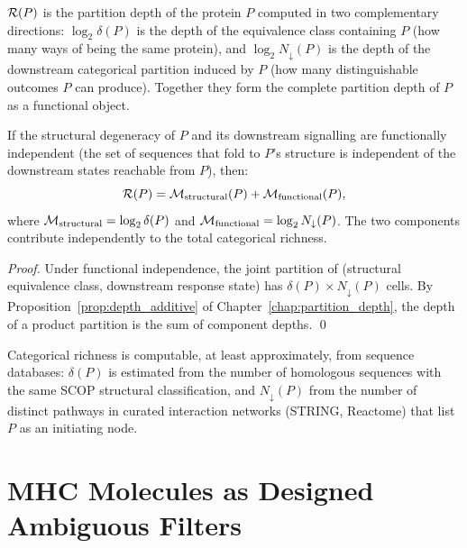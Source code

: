 \begin{remark}
$\mathcal{R}(P)$ is the partition depth of the protein $P$ computed in two
complementary directions: $\log_2 \delta(P)$ is the depth of the equivalence
class containing $P$ (how many ways of being the same protein), and
$\log_2 N_{\downarrow}(P)$ is the depth of the downstream categorical partition
induced by $P$ (how many distinguishable outcomes $P$ can produce). Together
they form the complete partition depth of $P$ as a functional object.
\end{remark}

\begin{proposition}
\label{prop:richness_additive}
If the structural degeneracy of $P$ and its downstream signalling are
functionally independent (the set of sequences that fold to $P$'s structure
is independent of the downstream states reachable from $P$), then:
\begin{equation}
  \mathcal{R}(P) = \mathcal{M}_{\mathrm{structural}}(P) + \mathcal{M}_{\mathrm{functional}}(P),
\end{equation}
where $\mathcal{M}_{\mathrm{structural}} = \log_2 \delta(P)$ and
$\mathcal{M}_{\mathrm{functional}} = \log_2 N_{\downarrow}(P)$. The two components
contribute independently to the total categorical richness.
\end{proposition}

\begin{proof}
Under functional independence, the joint partition of (structural equivalence
class, downstream response state) has $\delta(P) \times N_{\downarrow}(P)$
cells. By Proposition~\ref{prop:depth_additive} of
Chapter~\ref{chap:partition_depth}, the depth of a product partition is the
sum of component depths. \qed
\end{proof}

Categorical richness is computable, at least approximately, from sequence
databases: $\delta(P)$ is estimated from the number of homologous sequences
with the same SCOP structural classification, and $N_{\downarrow}(P)$ from
the number of distinct pathways in curated interaction networks (STRING,
Reactome) that list $P$ as an initiating node.

\section{MHC Molecules as Designed Ambiguous Filters}
\label{sec:mhc_filter}

